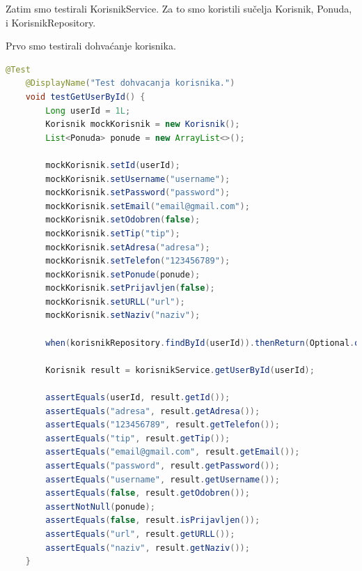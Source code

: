             Zatim smo testirali KorisnikService. Za to smo koristili sučelja Korisnik, Ponuda, i KorisnikRepository.
            
			Prvo smo testirali dohvaćanje korisnika. 
                  \begin{lstlisting}[language=Java, label=3st:java_example, basicstyle=\scriptsize]
 @Test
    @DisplayName("Test dohvacanja korisnika.")
    void testGetUserById() {
        Long userId = 1L;
        Korisnik mockKorisnik = new Korisnik();
        List<Ponuda> ponude = new ArrayList<>();

        mockKorisnik.setId(userId);
        mockKorisnik.setUsername("username");
        mockKorisnik.setPassword("password");
        mockKorisnik.setEmail("email@gmail.com");
        mockKorisnik.setOdobren(false);
        mockKorisnik.setTip("tip");
        mockKorisnik.setAdresa("adresa");
        mockKorisnik.setTelefon("123456789");
        mockKorisnik.setPonude(ponude);
        mockKorisnik.setPrijavljen(false);
        mockKorisnik.setURLL("url");
        mockKorisnik.setNaziv("naziv");

        when(korisnikRepository.findById(userId)).thenReturn(Optional.of(mockKorisnik));

        Korisnik result = korisnikService.getUserById(userId);

        assertEquals(userId, result.getId());
        assertEquals("adresa", result.getAdresa());
        assertEquals("123456789", result.getTelefon());
        assertEquals("tip", result.getTip());
        assertEquals("email@gmail.com", result.getEmail());
        assertEquals("password", result.getPassword());
        assertEquals("username", result.getUsername());
        assertEquals(false, result.getOdobren());
        assertNotNull(ponude);
        assertEquals(false, result.isPrijavljen());
        assertEquals("url", result.getURLL());
        assertEquals("naziv", result.getNaziv());
    }

    
				\end{lstlisting}
            
